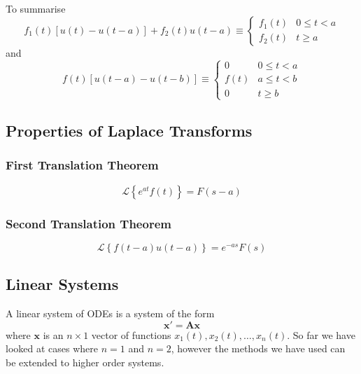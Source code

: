 \documentclass{article}
\begin{document}
To summarise
\begin{equation*}
    f_1\left( t \right) \left[ u\left( t \right) - u\left( t - a \right) \right] + f_2\left( t \right) u\left( t - a \right)
    \equiv
    \begin{cases}
        f_1\left( t \right) & 0 \leq t < a \\
        f_2\left( t \right) & t \geq a
    \end{cases}
\end{equation*}
and
\begin{equation*}
    f\left( t \right) \left[ u\left( t - a \right) - u\left( t - b \right) \right]
    \equiv
    \begin{cases}
        0                 & 0 \leq t < a \\
        f\left( t \right) & a \leq t < b \\
        0                 & t \geq b
    \end{cases}
\end{equation*}
\subsection{Properties of Laplace Transforms}
\subsubsection{First Translation Theorem}
\begin{equation*}
    \mathscr{L}\left\{ e^{at} f\left( t \right) \right\} = F\left( s - a \right)
\end{equation*}
\subsubsection{Second Translation Theorem}
\begin{equation*}
    \mathscr{L}\left\{ f\left( t - a \right) u\left( t - a \right) \right\} = e^{-as} F\left( s \right)
\end{equation*}
\subsection{Linear Systems}
A linear system of ODEs is a system of the form
\begin{equation*}
    \symbf{x}' = \symbf{A} \symbf{x}
\end{equation*}
where \(\symbf{x}\) is an \(n \times 1\) vector of functions \(x_1\left( t \right), x_2\left( t \right), \ldots, x_n\left( t \right)\).
So far we have looked at cases where \(n = 1\) and \(n = 2\), however the methods we have used can be extended to higher order systems.
\end{document}
